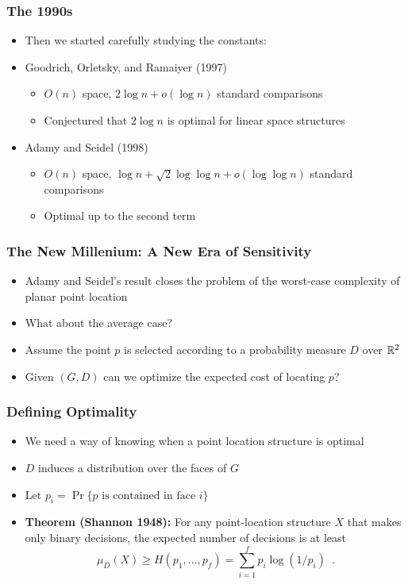 \documentclass{beamer}
\begin{document}
\frame
{
  \frametitle{The 1990s}
  \begin{itemize}
  \item<1-> Then we started carefully studying the constants:
   \item<2-> Goodrich, Orletsky, and Ramaiyer (1997)
   \begin{itemize}
      \item<3-> $O(n)$ space, $2\log n + o(\log n)$ standard comparisons
      \item<4-> Conjectured that $2\log n$ is optimal for linear space structures
   \end{itemize}
   \item<5-> Adamy and Seidel (1998)
   \begin{itemize}
      \item<6-> $O(n)$ space, $\log n + \sqrt{2}\log\log n +
o(\log\log n)$ standard comparisons
      \item<7-> Optimal up to the second term
   \end{itemize}
  \end{itemize}
}

\frame
{
  \frametitle{The New Millenium: A New Era of Sensitivity}
  \begin{itemize}
  \item<1-> Adamy and Seidel's result closes the problem of the
	worst-case complexity of planar point location
  \item<2-> What about the average case?
  \item<3-> Assume the point $p$ is selected according to a
	probability measure $D$ over $\mathbb{R}^2$
  \item<4-> Given $(G,D)$ can we optimize the expected cost of
	locating $p$?
  \end{itemize}
}

\frame
{
  \frametitle{Defining Optimality}
  \begin{itemize}
   \item<1-> We need a way of knowing when a point location structure
	is optimal
   \item<2-> $D$ induces a distribution over the faces of $G$
   \item<3-> Let $p_i=\Pr\{\mbox{$p$ is contained in face $i$}\}$
   \item<4-> \textbf{Theorem (Shannon 1948):}
     For any point-location structure $X$ that makes only binary decisions, the
expected number of decisions is at least
   \[
      \mu_D(X) \ge H(p_1,\ldots,p_f) = \sum_{i=1}^f p_i\log(1/p_i)  \enspace .
   \]
  \end{itemize}
}
\end{document}
